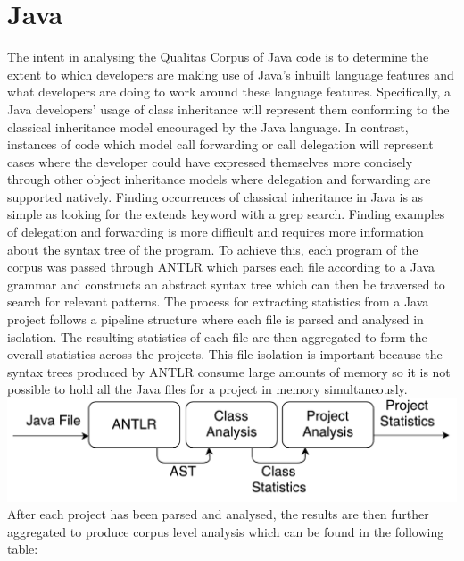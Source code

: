 \section{Java}
The intent in analysing the Qualitas Corpus of Java code is to determine the extent to which developers are making use of Java's inbuilt language features and what developers are doing to work around these language features. Specifically, a Java developers' usage of class inheritance will represent them conforming to the classical inheritance model encouraged by the Java language. In contrast, instances of code which model call forwarding or call delegation will represent cases where the developer could have expressed themselves more concisely through other object inheritance models where delegation and forwarding are supported natively. \newline
Finding occurrences of classical inheritance in Java is as simple as looking for the extends keyword with a grep search. Finding examples of delegation and forwarding is more difficult and requires more information about the syntax tree of the program. To achieve this, each program of the corpus was passed through ANTLR which parses each file according to a Java grammar and constructs an abstract syntax tree which can then be traversed to search for relevant patterns. \newline \newline
The process for extracting statistics from a Java project follows a pipeline structure where each file is parsed and analysed in isolation. The resulting statistics of each file are then aggregated to form the overall statistics across the projects. This file isolation is important because the syntax trees produced by ANTLR consume large amounts of memory so it is not possible to hold all the Java files for a project in memory simultaneously.
\newline
\newline
\includegraphics[scale=0.70]{AntlrPipeline.pdf}
\newline
\newline
After each project has been parsed and analysed, the results are then further aggregated to produce corpus level analysis which can be found in the following table:
